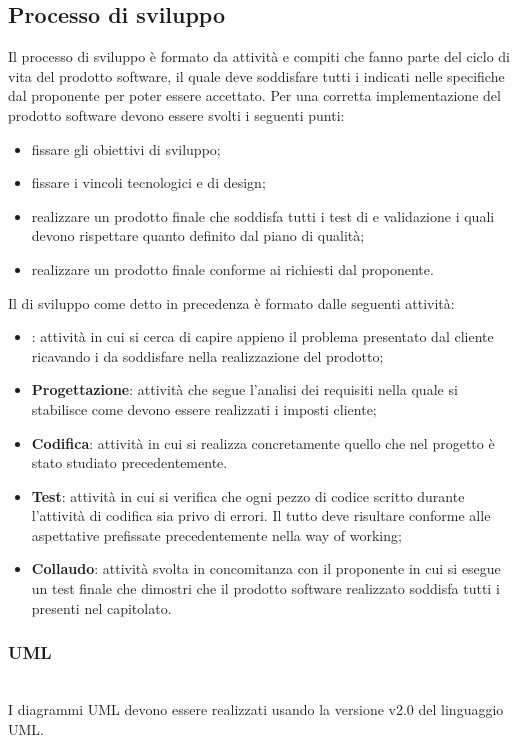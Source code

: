 \subsection{Processo di sviluppo}
Il processo di sviluppo è formato da attività e compiti che fanno parte del ciclo di vita del prodotto software, il quale deve soddisfare tutti i  indicati nelle specifiche dal proponente per poter essere accettato.
Per una corretta implementazione del prodotto software devono essere svolti i seguenti punti: 
\begin{itemize}
	\item fissare gli obiettivi di sviluppo;
	\item fissare i vincoli tecnologici e di design;
	\item realizzare un prodotto finale che soddisfa tutti i test di  e validazione i quali devono rispettare quanto definito dal piano di qualità;
	\item realizzare un prodotto finale conforme ai  richiesti dal proponente.
\end{itemize}		
Il  di sviluppo come detto in precedenza è formato dalle seguenti attività:
\begin{itemize}
	\item \textbf{\AdR{}}: attività in cui si cerca di capire appieno il problema presentato dal cliente ricavando i  da soddisfare nella realizzazione del prodotto;
	\item \textbf{Progettazione}: attività che segue l'analisi dei requisiti nella quale si stabilisce come devono essere realizzati i  imposti cliente;
	\item \textbf{Codifica}: attività in cui si realizza concretamente quello che nel progetto è stato  studiato precedentemente.
	\item \textbf{Test}: attività in cui si verifica che ogni pezzo di codice scritto durante l'attività di codifica sia privo di errori. Il tutto deve risultare conforme alle aspettative prefissate precedentemente nella way of working;
\item \textbf{Collaudo}: attività svolta in concomitanza con il proponente in cui si esegue un test finale che dimostri che il prodotto software realizzato soddisfa tutti i  presenti nel capitolato.
\end{itemize}


\subsubsection{UML}\mbox{}\\
I diagrammi UML devono essere realizzati usando la versione v2.0 del linguaggio UML.





